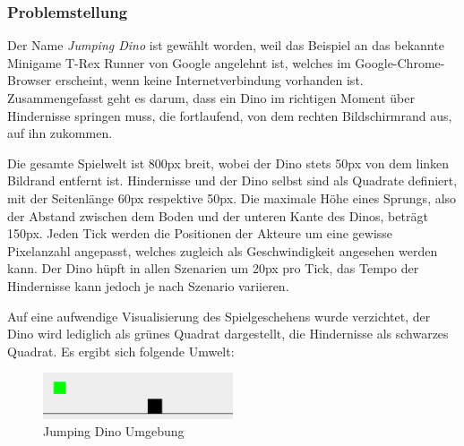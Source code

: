 \subsubsection{Problemstellung}\label{sec:jdProblemstellung}
Der Name \glqq \textit{Jumping Dino}\grqq{} ist gewählt worden, weil das Beispiel an das bekannte Minigame \glqq T-Rex Runner\grqq{} \cite{fandom} von Google angelehnt ist, welches im Google-Chrome-Browser erscheint, wenn keine Internetverbindung vorhanden ist. Zusammengefasst geht es darum, dass ein Dino im richtigen Moment über Hindernisse springen muss, die fortlaufend, von dem rechten Bildschirmrand aus, auf ihn zukommen.
\par 
Die gesamte Spielwelt ist 800px breit, wobei der Dino stets 50px von dem linken Bildrand entfernt ist. Hindernisse und der Dino selbst sind als Quadrate definiert, mit der Seitenlänge 60px respektive 50px. Die maximale Höhe eines Sprungs, also der Abstand zwischen dem Boden und der unteren Kante des Dinos, beträgt 150px. Jeden Tick werden die Positionen der Akteure um eine gewisse Pixelanzahl angepasst, welches zugleich als Geschwindigkeit angesehen werden kann. Der Dino hüpft in allen Szenarien um 20px pro Tick, das Tempo der Hindernisse kann jedoch je nach Szenario variieren.
\par 
Auf eine aufwendige Visualisierung des Spielgeschehens wurde verzichtet, der Dino wird lediglich als grünes Quadrat dargestellt, die Hindernisse als schwarzes Quadrat. Es ergibt sich folgende Umwelt:
\begin{figure}[H]
    \begin{center}
    \includegraphics[width=0.5\textwidth]{images/jumpingDinoUmg.png}  \end{center}
    \caption{Jumping Dino Umgebung}
    \label{fig:jumpingDinoUmg}
\end{figure}

